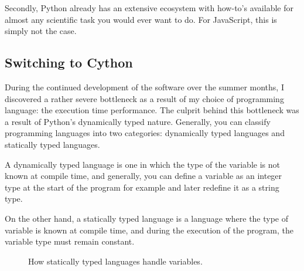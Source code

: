 Secondly, Python already has an extensive ecosystem with how-to’s available for almost any scientific task you would ever want to do. For JavaScript, this is simply not the case.\cite{javascript_vs_python}

\subsection{Switching to Cython}
During the continued development of the software over the summer months, I discovered a rather severe bottleneck as a result of my choice of programming language: the execution time performance. The culprit behind this bottleneck was a result of Python's dynamically typed nature. Generally, you can classify programming languages into two categories: dynamically typed languages and statically typed languages. 

\begin{definition}
A dynamically typed language is one in which the type of the variable is not known at compile time, and generally, you can define a variable as an integer type at the start of the program for example and later redefine it as a string type. 
\end{definition}

On the other hand, a statically typed language is a language where the type of variable is known at compile time, and during the execution of the program, the variable type must remain constant. 

\hfill

\begin{figure}[H]
    \centering
    \caption{How statically typed languages handle variables.}
\end{figure}

